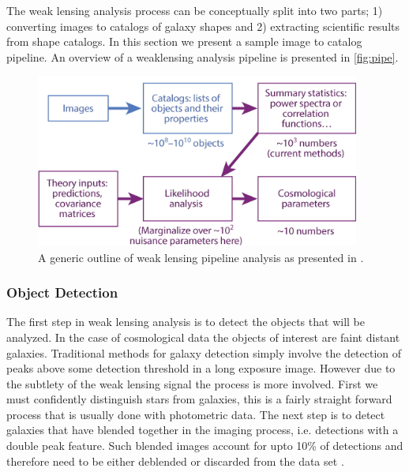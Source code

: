 The weak lensing analysis process can be conceptually split into two parts; 1) converting images to catalogs of galaxy shapes and 2) extracting scientific results from shape catalogs. In this section we present a sample image to catalog pipeline. An overview of a weaklensing analysis pipeline is presented in \autoref{fig:pipe}.

\begin{figure}
    \begin{small}
        \begin{center}
            \includegraphics[width=0.95\textwidth]{figs/pipe.jpg}
        \end{center}
        \caption{A generic outline of weak lensing pipeline analysis as presented in \cite{rachel_2018}.}
        \label{fig:pipe}
    \end{small}
\end{figure}


\subsubsection{Object Detection}

The first step in weak lensing analysis is to detect the objects that will be analyzed. In the case of cosmological data the objects of interest are faint distant galaxies. Traditional methods for galaxy detection simply involve the detection of peaks above some detection threshold in a long exposure image. However due to the subtlety of the weak lensing signal the process is more involved. First we must confidently distinguish stars from galaxies, this is a fairly straight forward process that is usually done with photometric data. The next step is to detect galaxies that have blended together in the imaging process, i.e. detections with a double peak feature. Such blended images account for upto 10\% of detections and therefore need to be either deblended or discarded from the data set \cite{rachel_2018,general_2013}.  

